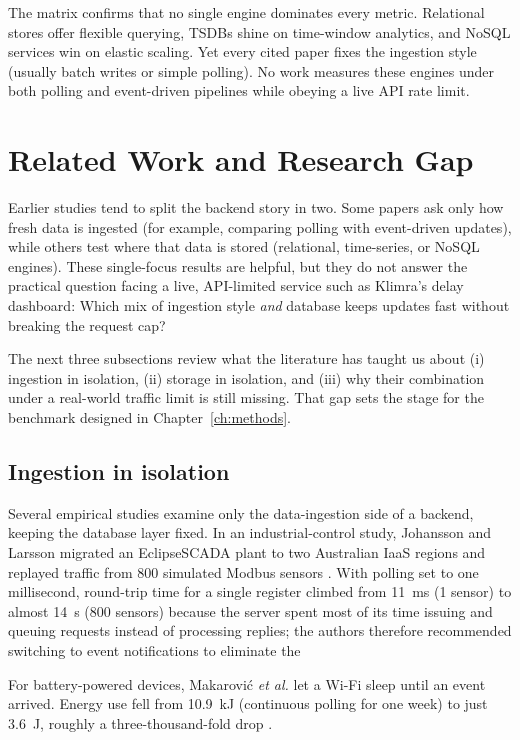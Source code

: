 \documentclass[nomenclature, english, biblatex]{kththesis}
\numberwithin{listing}{chapter}
\begin{document}
\noindent
The matrix confirms that no single engine dominates every metric.  
Relational stores offer flexible querying, \glspl{TSDB} shine on time-window analytics, and NoSQL services win on elastic scaling.  
Yet every cited paper fixes the ingestion style (usually batch writes or simple polling). No work measures these engines under both polling and event-driven pipelines while obeying a live API rate limit.  


\section{Related Work and Research Gap}
\label{sec:gap}
Earlier studies tend to split the backend story in two.
Some papers ask only how fresh data is ingested (for example, comparing polling with event-driven updates), while others test where that data is stored (relational, time-series, or NoSQL engines).
These single-focus results are helpful, but they do not answer the practical question facing a live, API-limited service such as Klimra's delay dashboard: Which mix of ingestion style \textit{and} database keeps updates fast without breaking the request cap? 

The next three subsections review what the literature has taught us about (i) ingestion in isolation, (ii) storage in isolation, and (iii) why their combination under a real-world traffic limit is still missing. That gap sets the stage for the benchmark designed in Chapter~\ref{ch:methods}.

\subsection{Ingestion in isolation}
Several empirical studies examine only the data-ingestion side of a backend, keeping the database layer fixed.  
In an industrial‐control study, Johansson and Larsson migrated an EclipseSCADA plant to two Australian IaaS regions and replayed traffic from 800 simulated Modbus sensors \cite{Johansson2021SCADAIaaS}.  
With polling set to one millisecond, round-trip time for a single register climbed from \SI{11}{\milli\second} (1 sensor) to almost \SI{14}{\second} (800 sensors) because the server spent most of its time issuing and queuing requests instead of processing replies; the authors therefore recommended switching to event notifications to eliminate the 

For battery-powered devices, Makarović \textit{et al.} let a Wi-Fi  sleep until an event arrived.  
Energy use fell from \SI{10.9}{\kilo\joule} (continuous polling for one week) to just \SI{3.6}{\joule}, roughly a three-thousand-fold drop \cite{Makarovi2022EnergyEfficientIoT}.
\end{document}

